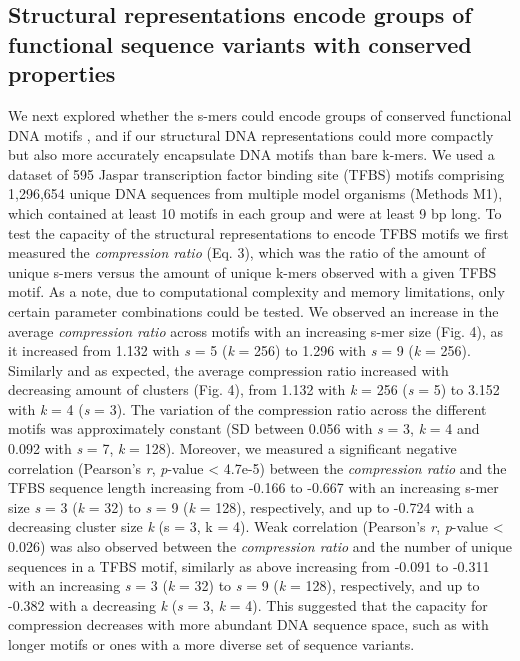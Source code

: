 \documentclass[sigconf]{acmart}
\begin{document}
\subsection{Structural representations encode groups of functional sequence variants with conserved properties}
We next explored whether the s-mers could encode groups of conserved functional DNA motifs \cite{Levo2015-iu}, and if our structural DNA representations could more compactly but also more accurately encapsulate DNA motifs than bare k-mers. We used a dataset of 595 Jaspar \cite{Khan2018-wj} transcription factor binding site (TFBS) motifs comprising 1,296,654 unique DNA sequences from multiple model organisms (Methods M1), which contained at least 10 motifs in each group and were at least 9 bp long. To test the capacity of the structural representations to encode TFBS motifs we first measured the \textit{compression ratio} (Eq. 3), which was the ratio of the amount of unique s-mers versus the amount of unique k-mers observed with a given TFBS motif. As a note, due to computational complexity and memory limitations, only certain parameter combinations could be tested. We observed an increase in the average \textit{compression ratio} across motifs with an increasing s-mer size (Fig. 4), as it increased from 1.132 with \textit{s} = 5 (\textit{k} = 256) to 1.296 with \textit{s} = 9 (\textit{k} = 256). Similarly and as expected, the average compression ratio increased with decreasing amount of clusters (Fig. 4), from 1.132 with \textit{k} = 256 (\textit{s} = 5) to 3.152 with \textit{k} = 4 (\textit{s} = 3). The variation of the compression ratio across the different motifs was approximately constant (SD between 0.056 with \textit{s} = 3, \textit{k} = 4 and 0.092 with \textit{s} = 7, \textit{k} = 128). Moreover, we measured a significant negative correlation (Pearson's \textit{r}, \textit{p}-value < 4.7e-5) between the \textit{compression ratio} and the TFBS sequence length increasing from -0.166 to -0.667 with an increasing s-mer size \textit{s} = 3 (\textit{k} = 32) to \textit{s} = 9 (\textit{k} = 128), respectively, and up to -0.724 with a decreasing cluster size \textit{k} (s = 3, k = 4). Weak correlation (Pearson's \textit{r}, \textit{p}-value < 0.026) was also observed between the \textit{compression ratio} and the number of unique sequences in a TFBS motif, similarly as above increasing from -0.091 to -0.311 with an increasing \textit{s} = 3 (\textit{k} = 32) to \textit{s} = 9 (\textit{k} = 128), respectively, and up to -0.382 with a decreasing \textit{k} (\textit{s} = 3, \textit{k} = 4). This suggested that the capacity for compression decreases with more abundant DNA sequence space, such as with longer motifs or ones with a more diverse set of sequence variants.
\end{document}

